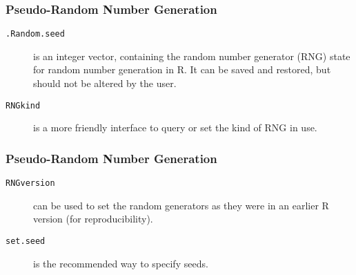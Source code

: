 \documentclass[MAIN.tex]{subfiles}
\begin{document}
 
	
\begin{frame}[fragile]
	\frametitle{Pseudo-Random Number Generation}
	\begin{description}		
	\item[\texttt{.Random.seed}] is an integer vector, containing the random number generator (RNG) state for random number generation in R. It can be saved and restored, but should not be altered by the user.
	
	\item[\texttt{RNGkind}] is a more friendly interface to query or set the kind of RNG in use.
	\end{description}
\end{frame}
\begin{frame}
		\frametitle{Pseudo-Random Number Generation}
		\begin{description}	
\item[\texttt{RNGversion}] can be used to set the random generators as they were in an earlier R version (for reproducibility).
	
\item[\texttt{set.seed}] is the recommended way to specify seeds.
	\end{description}
\end{frame}
\end{document}
